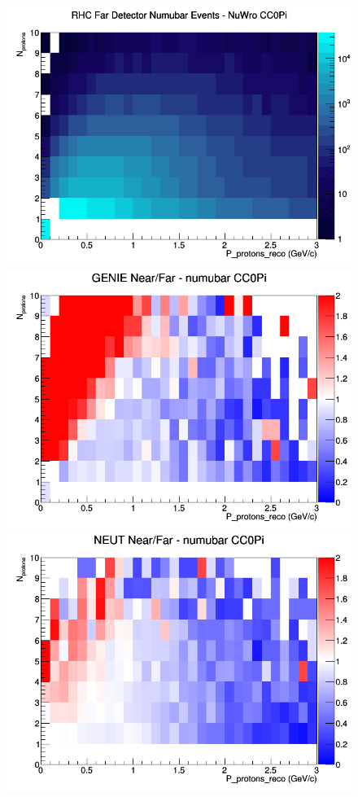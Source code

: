 \begin{figure}[h]
\endminipage
{}
\includegraphics[width=\linewidth]{eff_N_P/GAr/protons/CC0Pi_RHC_FD_numubar_N_P_NuWro.png}
\endminipage
\newline
{}
\includegraphics[width=\linewidth]{eff_N_P/GAr/protons/ratios/CC0Pi_GENIE_numubar_NF_N_P.png}
\endminipage
{}
\includegraphics[width=\linewidth]{eff_N_P/GAr/protons/ratios/CC0Pi_NEUT_numubar_NF_N_P.png}

\end{figure}
